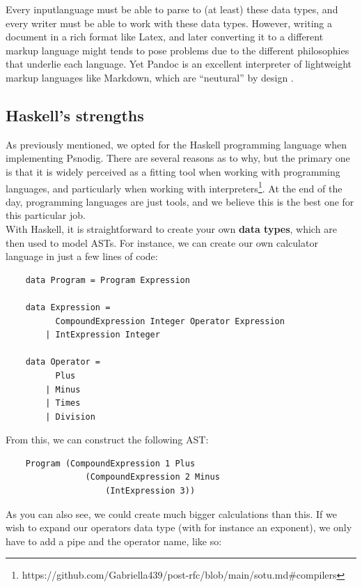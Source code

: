 
Every inputlanguage must be able to parse to (at least) these data types, and every writer must be able to work with these data types. However, writing a document in a rich format like Latex, and later converting it to a different markup language might tends to pose problems due to the different philosophies that underlie each language. Yet Pandoc is an excellent interpreter of lightweight markup languages like Markdown, which are ``neutural'' by design \cite{dominici2014}.

\subsection{Haskell's strengths}
As previously mentioned, we opted for the Haskell programming language when implementing Psnodig. There are several reasons as to why, but the primary one is that it is widely perceived as a fitting tool when working with programming languages, and particularly when working with interpreters\footnote{https://github.com/Gabriella439/post-rfc/blob/main/sotu.md\#compilers}. At the end of the day, programming languages are just tools, and we believe this is the best one for this particular job. \hfill \\

With Haskell, it is straightforward to create your own \textbf{data types}, which are then used to model ASTs. For instance, we can create our own calculator language in just a few lines of code:

\begin{verbatim}
    data Program = Program Expression

    data Expression =
          CompoundExpression Integer Operator Expression
        | IntExpression Integer

    data Operator =
          Plus
        | Minus
        | Times
        | Division
\end{verbatim}

From this, we can construct the following AST:

\begin{verbatim}
    Program (CompoundExpression 1 Plus
                (CompoundExpression 2 Minus
                    (IntExpression 3))
\end{verbatim}

As you can also see, we could create much bigger calculations than this. If we wish to expand our operators data type (with for instance an exponent), we only have to add a pipe and the operator name, like so:

